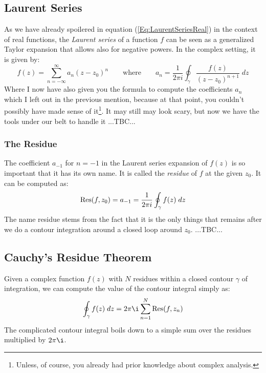 \subsection{Laurent Series}
As we have already spoilered in equation (\ref{Eq:LaurentSeriesReal}) in the context of real functions, the \emph{Laurent series} of a function $f$ can be seen as a generalized Taylor expansion that allows also for negative powers. In the complex setting, it is given by:
\begin{equation}
f(z) = \sum_{n=-\infty}^{\infty} a_n (z - z_0)^n 
\qquad \text{where} \qquad
a_n = \frac{1}{2 \pi i} \oint_{\gamma} \frac{f(z)}{(z-z_0)^{n+1}} \; dz
\end{equation}
Where I now have also given you the formula to compute the coefficients $a_n$ which I left out in the previous mention, because at that point, you couldn't possibly have made sense of it\footnote{Unless, of course, you already had prior knowledge about complex analysis.}. It may still may look scary, but now we have the tools under our belt to handle it ...TBC...



\subsubsection{The Residue}
The coefficient $a_{-1}$ for $n=-1$ in the Laurent series expansion of $f(z)$ is so important that it has its own name. It is called the \emph{residue} of $f$ at the given $z_0$. It can be computed as:
\begin{equation}
\operatorname{Res}(f,z_0) = a_{-1} = \frac{1}{2 \pi i} \oint_{\gamma} f(z) \; dz
\end{equation}
The name residue stems from the fact that it is the only things that remains after we do a contour integration around a closed loop around $z_0$. ...TBC...




\subsection{Cauchy's Residue Theorem}
Given a complex function $f(z)$ with $N$ residues within a closed contour $\gamma$ of integration, we can compute the value of the contour integral simply as:
\begin{equation}
\oint_{\gamma} f(z) \; dz = 2 \pi \i \sum_{n=1}^{N} \Res(f, z_n)
\end{equation}
The complicated contour integral boils down to a simple sum over the residues multiplied by $2 \pi \i$.

